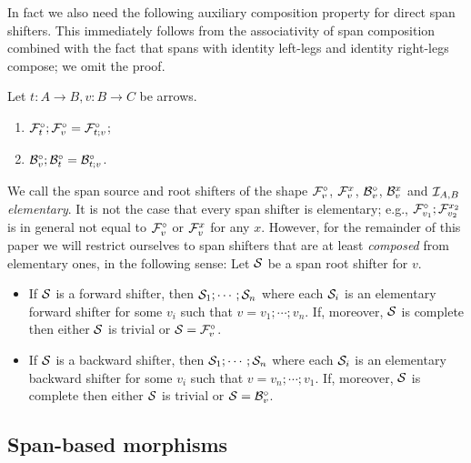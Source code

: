 %
In fact we also need the following auxiliary composition property for direct span shifters. This immediately follows from the associativity of span composition combined with the fact that spans with identity left-legs and identity right-legs compose; we omit the proof.
%
\begin{lemma}
Let $t:A\to B,v:B\to C$ be arrows.
\begin{enumerate}[topsep=\smallskipamount]
\item $\dF t;\dF v=\dF{t;v}$;
\item $\dB v;\dB t=\dB{t;v}$.
\end{enumerate}
\end{lemma}
%
We call the span source and root shifters of the shape $\dF v$, $\rF v x$, $\dB v$, $\rB v x$ and $\cI_{A,B}$ \emph{elementary}. It is not the case that every span shifter is elementary; e.g., $\dF{v_1};\rF{v_2}{x_2}$ is in general not equal to $\dF v$ or $\rF v x$ for any $x$. However, for the remainder of this paper we will restrict ourselves to span shifters that are at least \emph{composed} from elementary ones, in the following sense:
%
Let $\cS$ be a span root shifter for $v$.
\begin{assumption}
\begin{itemize}[topsep=\smallskipamount]
\item If $\cS$ is a forward shifter, then $\cS_1;\cdots;\cS_n$ where each $\cS_i$ is an elementary forward shifter for some $v_i$ such that $v=v_1;\cdots;v_n$. If, moreover, $\cS$ is complete then either $\cS$ is trivial or $\cS=\dF v$.
\item If $\cS$ is a backward shifter, then $\cS_1;\cdots;\cS_n$ where each $\cS_i$ is an elementary backward shifter for some $v_i$ such that $v=v_n;\cdots;v_1$. If, moreover, $\cS$ is complete then either $\cS$ is trivial or $\cS=\dB{v}$.
\end{itemize}
\end{assumption}
 
\subsection{Span-based morphisms}

